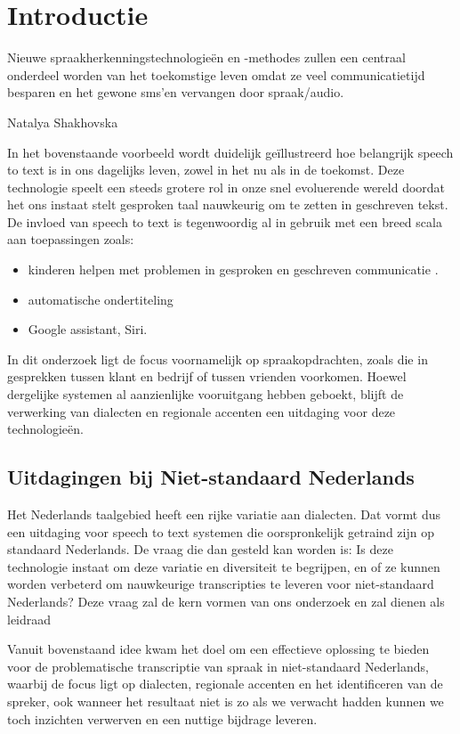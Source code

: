 
\section{Introductie}%
\label{sec:introductie}
\epigraph{Nieuwe spraakherkenningstechnologieën en -methodes zullen een centraal onderdeel worden van 
    het toekomstige leven omdat ze veel communicatietijd besparen en het gewone sms'en 
    vervangen door spraak/audio.}{Natalya Shakhovska}
    
In het bovenstaande voorbeeld wordt duidelijk geïllustreerd hoe belangrijk speech to text is in ons dagelijks leven, zowel in het nu als in de toekomst. Deze technologie speelt een steeds grotere rol in onze snel evoluerende wereld doordat het ons instaat stelt gesproken taal nauwkeurig om te zetten in geschreven tekst. De invloed van speech to text is tegenwoordig al in gebruik met een breed scala aan toepassingen zoals:
\begin{itemize}
    \item kinderen helpen met problemen in gesproken en geschreven communicatie \autocite{Kambouri2023}.
    \item automatische ondertiteling
    \item Google assistant, Siri.
\end{itemize}
In dit onderzoek ligt de focus voornamelijk op spraakopdrachten, zoals die in gesprekken tussen klant en bedrijf of tussen vrienden voorkomen. Hoewel dergelijke systemen al aanzienlijke vooruitgang hebben geboekt, blijft de verwerking van dialecten en regionale accenten een uitdaging voor deze technologieën.

\subsection{Uitdagingen bij Niet-standaard Nederlands}
Het Nederlands taalgebied heeft een rijke variatie aan dialecten. Dat vormt dus een uitdaging voor speech to text systemen die oorspronkelijk getraind zijn op standaard Nederlands. De vraag die dan gesteld kan worden is: Is deze technologie instaat om deze variatie en diversiteit te begrijpen, en of ze kunnen worden verbeterd om nauwkeurige transcripties te leveren voor niet-standaard Nederlands?
Deze vraag zal de kern vormen van ons onderzoek en zal dienen als leidraad

Vanuit bovenstaand idee kwam het doel om een effectieve oplossing te bieden voor de problematische transcriptie van spraak in niet-standaard Nederlands, waarbij de focus ligt op dialecten, regionale accenten en het identificeren van de spreker, ook wanneer het resultaat niet is zo als we verwacht hadden kunnen we toch inzichten verwerven en een nuttige bijdrage leveren.

